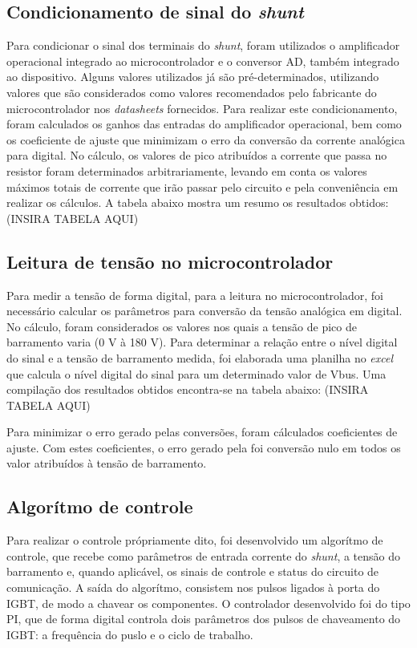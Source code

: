 \subsection{Condicionamento de sinal do \textit{shunt}}
Para condicionar o sinal dos terminais do \textit{shunt}, foram utilizados o amplificador operacional integrado ao microcontrolador e o conversor AD, também integrado ao dispositivo. Alguns valores utilizados já são pré-determinados, utilizando valores que são considerados como valores recomendados pelo fabricante do microcontrolador nos \textit{datasheets} fornecidos. Para realizar este condicionamento, foram calculados os ganhos das entradas do amplificador operacional, bem como os coeficiente de ajuste que minimizam o erro da conversão da corrente analógica para digital. No cálculo, os valores de pico atribuídos a corrente que passa no resistor foram determinados arbitrariamente, levando em conta os valores máximos totais de corrente que irão passar pelo circuito e pela conveniência em realizar os cálculos. A tabela abaixo mostra um resumo os resultados obtidos:
(INSIRA TABELA AQUI)

\subsection{Leitura de tensão no microcontrolador}
Para medir a tensão de forma digital, para a leitura no microcontrolador, foi necessário calcular os parâmetros para conversão da tensão analógica em digital. No cálculo, foram considerados os valores nos quais a tensão de pico de barramento varia (0 V à 180 V). Para determinar a relação entre o nível digital do sinal e a tensão de barramento medida, foi elaborada uma planilha no \textit{excel} que calcula o nível digital do sinal para um determinado valor de Vbus. Uma compilação dos resultados obtidos encontra-se na tabela abaixo:
(INSIRA TABELA AQUI)

Para minimizar o erro gerado pelas conversões, foram cálculados coeficientes de ajuste. Com estes coeficientes, o erro gerado pela foi conversão nulo em todos os valor atribuídos à tensão de barramento.

\subsection{Algorítmo de controle}
Para realizar o controle própriamente dito, foi desenvolvido um algorítmo de controle, que recebe como parâmetros de entrada corrente do \textit{shunt}, a tensão do barramento e, quando aplicável, os sinais de controle e status do circuito de comunicação. A saída do algorítmo, consistem nos pulsos ligados à porta do IGBT, de modo a chavear os componentes. O controlador desenvolvido foi do tipo PI, que de forma digital controla dois parâmetros dos pulsos de chaveamento do IGBT: a frequência do puslo e o ciclo de trabalho.

